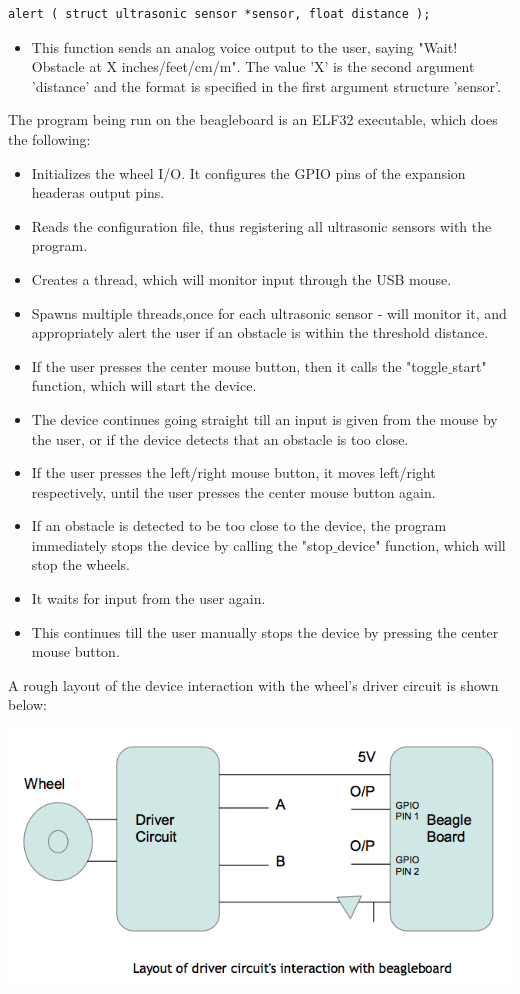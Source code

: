 \documentclass[12pt]{article}
\begin{document}
\begin{verbatim}
alert ( struct ultrasonic sensor *sensor, float distance );\end{verbatim}
\begin{itemize}
\item This function sends an analog voice output to the user, saying "Wait! Obstacle at X inches/feet/cm/m". The value 'X' is the second argument 'distance' and the format is specified in the first argument structure 'sensor'.
\end{itemize}
The program being run on the beagleboard is an ELF32 executable, which does the following:
\begin{itemize}
\item Initializes the wheel I/O. It configures the GPIO pins of the expansion headeras output pins.
\item Reads the configuration file, thus registering all ultrasonic sensors with the program.
\item Creates a thread, which will monitor input through the USB mouse.
\item Spawns multiple threads,once for each ultrasonic sensor - will monitor it, and appropriately alert the user if an obstacle is within the threshold distance.
\item If the user presses the center mouse button, then it calls the "toggle$\_$start" function, which will start the device.
\item The device continues going straight till an input is given from the mouse by the user, or if the device detects that an obstacle is too close.
\item If the user presses the left/right mouse button, it moves left/right respectively, until the user presses the center mouse button again.
\item If an obstacle is detected to be too close to the device, the program immediately stops the device by calling the "stop$\_$device" function, which will stop the wheels.
\item It waits for input from the user again.
\item This continues till the user manually stops the device by pressing the center mouse button.
\end{itemize}
A rough layout of the device interaction with the wheel's driver circuit is shown below:
\\
\begin{center} \includegraphics[scale=0.4]{driver_circuit} \end{center}
\end{document}

